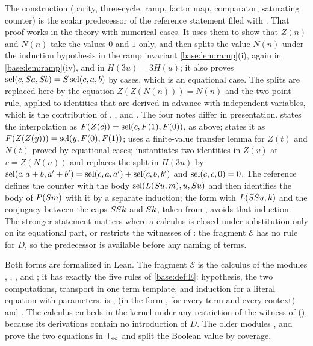 \begin{remark}
\label{base:rem:predsources}
The construction (parity, three-cycle, ramp, factor map, comparator,
saturating counter) is the scalar predecessor of the reference statement
filed with .  That proof works in the theory with
numerical cases.  It uses them to show that $Z(n)$ and $N(n)$ take the
values $0$ and $1$ only, and then splits the value $N(n)$ under the
induction hypothesis in the ramp invariant \cref{base:lem:ramp}(i), again in
\cref{base:lem:ramp}(iv), and in $H(3u)=3H(u)$; it also proves
$\operatorname{sel}(c,S a,S b)=S\operatorname{sel}(c,a,b)$ by cases, which is an equational
case.  The splits are replaced here by the equation $Z(Z(N(n)))=N(n)$ and
the two-point rule, applied to identities that are derived in advance with
independent variables, which is the contribution of ,
,  and .
The four notes differ in presentation.   states the
interpolation as $F(Z(c))=\operatorname{sel}(c,F(1),F(0))$, as above;
 states it as $F(Z(Z(y)))=\operatorname{sel}(y,F(0),F(1))$;
 uses a finite-value transfer lemma for $Z(t)$ and
$N(t)$ proved by equational cases;  instantiates two
identities in $Z(v)$ at $v=Z(N(n))$ and replaces the split in $H(3u)$ by
$\operatorname{sel}(c,a+b,a'+b')=\operatorname{sel}(c,a,a')+\operatorname{sel}(c,b,b')$ and $\operatorname{sel}(c,c,0)=0$.  The
reference defines the counter with the body $\operatorname{sel}(L(S u,m),u,S u)$ and
then identifies the body of $P(S m)$ with it by a separate induction; the
form with $L(SS u,k)$ and the conjugacy between the caps $SS k$
and $S k$, taken from , avoids that induction.  The
stronger statement matters where a calculus is closed under substitution
only on its equational part, or restricts the witnesses of :
the fragment $\mathcal E$ has no rule for $D$, so the predecessor is
available before any naming of terms.

Both forms are formalized in Lean.  The fragment $\mathcal E$ is the
calculus  of the modules , ,
,  and ; it has exactly the five
rules of \cref{base:def:E}: hypothesis, the two computations, transport in
one term template, and induction for a literal equation with parameters.
 is , 
(in the form , for every term and
every context) and .  The calculus embeds in the
kernel under any restriction of the witness of 
(), because its derivations contain no introduction of $D$.
The older modules ,  and 
prove the two equations in $\mathsf{T}_{\mathrm{eq}}$ and split the Boolean value by coverage.
\end{remark}

